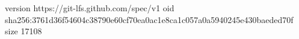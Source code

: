 version https://git-lfs.github.com/spec/v1
oid sha256:3761d36f54604c38790e60cf70ea0ac1e8ca1c057a0a5940245e430baeded70f
size 17108
